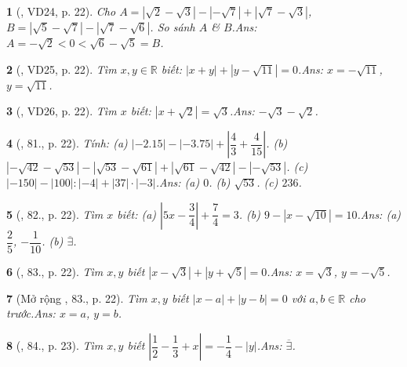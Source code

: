 \documentclass{article}
\newtheorem{baitoan}{}
\begin{document}
\begin{baitoan}[\cite{Tuyen_Toan_7}, VD24, p. 22]
	Cho $A = |\sqrt{2} - \sqrt{3}| - |-\sqrt{7}| + |\sqrt{7} - \sqrt{3}|$, $B = |\sqrt{5} - \sqrt{7}| - |\sqrt{7} - \sqrt{6}|$. So sánh $A$ \& $B$.\hfill{\sf Ans:} $A = -\sqrt{2} < 0 < \sqrt{6} - \sqrt{5} = B$.
\end{baitoan}	

\begin{baitoan}[\cite{Tuyen_Toan_7}, VD25, p. 22]
	Tìm $x,y\in\mathbb{R}$ biết: $|x + y| + |y - \sqrt{11}| = 0$.\hfill{\sf Ans:} $x = -\sqrt{11}$, $y = \sqrt{11}$.
\end{baitoan}

\begin{baitoan}[\cite{Tuyen_Toan_7}, VD26, p. 22]
	Tìm $x$ biết: $|x + \sqrt{2}| = \sqrt{3}$.\hfill{\sf Ans:} $-\sqrt{3} - \sqrt{2}$.
\end{baitoan}

\begin{baitoan}[\cite{Tuyen_Toan_7}, 81., p. 22]
	Tính: (a) $|-2.15| - |-3.75| + \left|\dfrac{4}{3} + \dfrac{4}{15}\right|$. (b) $|-\sqrt{42} - \sqrt{53}| - |\sqrt{53} - \sqrt{61}| + |\sqrt{61} - \sqrt{42}| - |-\sqrt{53}|$. (c) $|-150| - |100|:|-4| + |37|\cdot|-3|$.\hfill{\sf Ans:} (a) $0$. (b) $\sqrt{53}$. (c) $236$.
\end{baitoan}

\begin{baitoan}[\cite{Tuyen_Toan_7}, 82., p. 22]
	Tìm $x$ biết: (a) $\left|5x - \dfrac{3}{4}\right| + \dfrac{7}{4} = 3$. (b) $9 - |x - \sqrt{10}| = 10$.\hfill{\sf Ans:} (a) $\dfrac{2}{5}$, $-\dfrac{1}{10}$. (b) $\overline{\exists}$.
\end{baitoan}

\begin{baitoan}[\cite{Tuyen_Toan_7}, 83., p. 22]
	Tìm $x,y$ biết $|x - \sqrt{3}| + |y + \sqrt{5}| = 0$.\hfill{\sf Ans:} $x = \sqrt{3}$, $y = -\sqrt{5}$.
\end{baitoan}

\begin{baitoan}[Mở rộng \cite{Tuyen_Toan_7}, 83., p. 22]
	Tìm $x,y$ biết $|x - a| + |y - b| = 0$ với $a,b\in\mathbb{R}$ cho trước.\hfill{\sf Ans:} $x = a$, $y = b$.
\end{baitoan}

\begin{baitoan}[\cite{Tuyen_Toan_7}, 84., p. 23]
	Tìm $x,y$ biết $\left|\dfrac{1}{2} - \dfrac{1}{3} + x\right| = -\dfrac{1}{4} - |y|$.\hfill{\sf Ans:} $\overline{\exists}$.
\end{baitoan}
\end{document}
